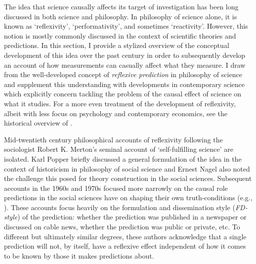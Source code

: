 
The idea that science causally affects its target of investigation has been long discussed in both science and philosophy. In philosophy of science alone, it is known as `reflexivity', `performativity', and sometimes `reactivity'. However, this notion is mostly commonly discussed in the context of scientific theories and predictions. In this section, I provide a stylized overview of the conceptual development of this idea over the past century in order to subsequently develop an account of how measurements can casually affect what they measure. I draw from the well-developed concept of \textit{reflexive prediction} in philosophy of science and supplement this understanding with developments in contemporary science which explicitly concern tackling the problem of the causal effect of science on what it studies. For a more even treatment of the development of reflexivity, albeit with less focus on psychology and contemporary economics, see the historical overview of \autocite{mackinnon2006}.  

Mid-twentieth century philosophical accounts of reflexivity following the sociologist Robert K. Merton's \autocite*{merton1948} seminal account of `self-fulfilling science' are isolated. Karl Popper \autocite*{popper1953} briefly discussed a general formulation of the idea in the context of historicism in philosophy of social science and Ernest Nagel \autocite*{nagel1961} also noted the challenge this posed for theory construction in the social sciences. Subsequent accounts in the 1960s and 1970s focused more narrowly on the causal role predictions in the social sciences have on shaping their own truth-conditions (e.g., \cite{buck1963, romanos1973}). These accounts focus heavily on the formulation and dissemination style (\textit{FD-style}) of the prediction: whether the prediction was published in a newspaper or discussed on cable news, whether the prediction was public or private, etc. To different but ultimately similar degrees, these authors acknowledge that a single prediction will not, by itself, have a reflexive effect independent of how it comes to be known by those it makes predictions about. 


